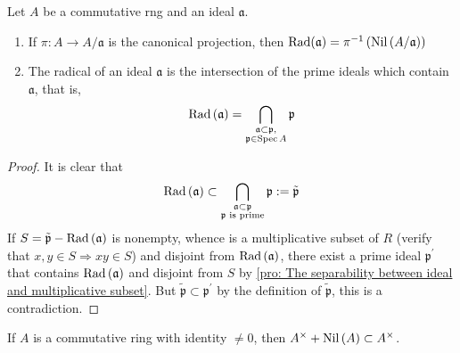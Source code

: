 \begin{theorem}
    \label{thm: radical}
    Let $A$ be a commutative rng and an ideal $\mathfrak{a}$.
    \begin{enumerate}
        \item
              If $\pi: A \rightarrow A / \mathfrak{a}$ is the canonical projection, then
              $\operatorname{\operatorname{Rad}}(\mathfrak{a})
                  =
                  \pi^{-1}\left(\operatorname{\operatorname{Nil}}\left(A / \mathfrak{a}\right)\right)$

        \item
              The radical of an ideal $\mathfrak{a}$ is the intersection of the prime ideals which contain $\mathfrak{a}$, that is,
              \begin{equation*}
                  \operatorname{\operatorname{Rad}}\left(\mathfrak{a}\right)
                  =
                  \bigcap_{\substack{\mathfrak{a}\subset\mathfrak{p},
                          \\
                          \mathfrak{p} \in \operatorname{Spec} A}}
                  \mathfrak{p}
              \end{equation*}
    \end{enumerate}
    \begin{proof}
        It is clear that
        \begin{equation*}
            \operatorname{\operatorname{Rad}}\left(\mathfrak{a}\right)
            \subset
            \bigcap_{\substack{\mathfrak{a}\subset\mathfrak{p}
                    \\
                    \mathfrak{p} \text{ is prime}}}
            \mathfrak{p}
            :=
            \tilde{\mathfrak{p}}
        \end{equation*}
        If $ S = \tilde{\mathfrak{p}}-\operatorname{\operatorname{Rad}}\left(\mathfrak{a}\right)$ is nonempty, whence is a multiplicative subset of $R$ (verify that $x,y\in S \Rightarrow xy \in S$) and disjoint from $\operatorname{\operatorname{Rad}}\left(\mathfrak{a}\right)$, there exist a prime ideal $\mathfrak{p}^\prime$ that contains $\operatorname{\operatorname{Rad}}\left(\mathfrak{a}\right)$ and disjoint from $S$ by \ref{pro: The separability between ideal and multiplicative subset}. But $\tilde{\mathfrak{p}}\subset \mathfrak{p}^\prime$ by the definition of $\tilde{\mathfrak{p}}$, this is a contradiction.
    \end{proof}
\end{theorem}

\begin{proposition}
    If $A$ is a commutative ring with identity $\neq 0$, then $A^{\times}+\operatorname{\operatorname{Nil}}\left(A\right)\subset A^{\times}$.
\end{proposition}







